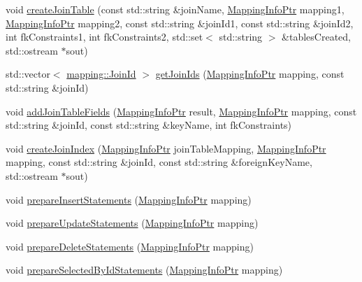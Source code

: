 \begin{DoxyCompactItemize}
\item 
void \hyperlink{classdbo_1_1connection_a392f2f9b92b477aac4c61ed23f3f3671}{create\+Join\+Table} (const std\+::string \&join\+Name, \hyperlink{classdbo_1_1connection_acca03a784c87ffb1ec7bdf33f526dff5}{Mapping\+Info\+Ptr} mapping1, \hyperlink{classdbo_1_1connection_acca03a784c87ffb1ec7bdf33f526dff5}{Mapping\+Info\+Ptr} mapping2, const std\+::string \&join\+Id1, const std\+::string \&join\+Id2, int fk\+Constraints1, int fk\+Constraints2, std\+::set$<$ std\+::string $>$ \&tables\+Created, std\+::ostream $\ast$sout)
\item 
std\+::vector$<$ \hyperlink{structdbo_1_1mapping_1_1_join_id}{mapping\+::\+Join\+Id} $>$ \hyperlink{classdbo_1_1connection_a73cc012991e1f732b8f871ba8a36143c}{get\+Join\+Ids} (\hyperlink{classdbo_1_1connection_acca03a784c87ffb1ec7bdf33f526dff5}{Mapping\+Info\+Ptr} mapping, const std\+::string \&join\+Id)
\item 
void \hyperlink{classdbo_1_1connection_aa92e86aed48a4224501c7a2d3700d8d8}{add\+Join\+Table\+Fields} (\hyperlink{classdbo_1_1connection_acca03a784c87ffb1ec7bdf33f526dff5}{Mapping\+Info\+Ptr} result, \hyperlink{classdbo_1_1connection_acca03a784c87ffb1ec7bdf33f526dff5}{Mapping\+Info\+Ptr} mapping, const std\+::string \&join\+Id, const std\+::string \&key\+Name, int fk\+Constraints)
\item 
void \hyperlink{classdbo_1_1connection_ae8f0004c9e859c113918b5a8e766bb9e}{create\+Join\+Index} (\hyperlink{classdbo_1_1connection_acca03a784c87ffb1ec7bdf33f526dff5}{Mapping\+Info\+Ptr} join\+Table\+Mapping, \hyperlink{classdbo_1_1connection_acca03a784c87ffb1ec7bdf33f526dff5}{Mapping\+Info\+Ptr} mapping, const std\+::string \&join\+Id, const std\+::string \&foreign\+Key\+Name, std\+::ostream $\ast$sout)
\item 
void \hyperlink{classdbo_1_1connection_a73872df92d7ecfbdc57c8d8c1798392c}{prepare\+Insert\+Statements} (\hyperlink{classdbo_1_1connection_acca03a784c87ffb1ec7bdf33f526dff5}{Mapping\+Info\+Ptr} mapping)
\item 
void \hyperlink{classdbo_1_1connection_a0b6721462bddeb5349838e498e0ea839}{prepare\+Update\+Statements} (\hyperlink{classdbo_1_1connection_acca03a784c87ffb1ec7bdf33f526dff5}{Mapping\+Info\+Ptr} mapping)
\item 
void \hyperlink{classdbo_1_1connection_a7b9e24007952236d77dfabba20617e75}{prepare\+Delete\+Statements} (\hyperlink{classdbo_1_1connection_acca03a784c87ffb1ec7bdf33f526dff5}{Mapping\+Info\+Ptr} mapping)
\item 
void \hyperlink{classdbo_1_1connection_aa0953ba22e1fb34a7e80e557e117904f}{prepare\+Selected\+By\+Id\+Statements} (\hyperlink{classdbo_1_1connection_acca03a784c87ffb1ec7bdf33f526dff5}{Mapping\+Info\+Ptr} mapping)

\end{DoxyCompactItemize}
